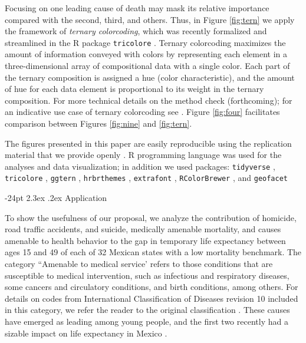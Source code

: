\documentclass[10pt, twoside, parskip=half]{article}
\makeatletter
\renewcommand\section{\@startsection {section}{1}{\z@}%
                                   {-24pt}%
                                   {2.3ex \@plus.2ex}%
                                   {\normalfont\large\bfseries}}
\makeatother
\begin{document}
Focusing on one leading cause of death may mask its relative importance compared with the second, third, and others. Thus, in Figure \ref{fig:tern} we apply the framework of \emph{ternary colorcoding}, which was recently formalized and streamlined in the R package \texttt{tricolore} \citep{scholey2018}. Ternary colorcoding maximizes the amount of information conveyed with colors by representing each element in a three-dimensional array of compositional data with a single color. Each part of the ternary composition is assigned a hue (color characteristic), and the amount of hue for each data element is proportional to its weight in the ternary composition. For more technical details on the method check \citet{scholeyforthcomingdr} (forthcoming); for an indicative use case of ternary colorcoding see \citet{kashnitsky2018tl}. Figure \ref{fig:four} facilitates comparison between Figures \ref{fig:nine} and \ref{fig:tern}.

The figures presented in this paper are easily reproducible using the replication material that we provide openly \citep{kashnitsky2019}. R programming language \citep{rcoreteam2018} was used for the analyses and data visualization; in addition we used packages: \texttt{tidyverse} \citep{wickham2017b}, \texttt{tricolore} \citep{scholey2018}, \texttt{ggtern} \citep{hamilton2018jss}, \texttt{hrbrthemes} \citep{rudis2018}, \texttt{extrafont} \citep{chang2014}, \texttt{RColorBrewer} \citep{neuwirth2014}, and \texttt{geofacet} \citep{hafen2019}

\hypertarget{application}{%
\section{Application}\label{application}}

To show the usefulness of our proposal, we analyze the contribution of homicide, road traffic accidents, and suicide, medically amenable mortality, and causes amenable to health behavior to the gap in temporary life expectancy between ages 15 and 49 of each of 32 Mexican states with a low mortality benchmark. The category ``Amenable to medical service' refers to those conditions that are susceptible to medical intervention, such as infectious and respiratory diseases, some cancers and circulatory conditions, and birth conditions, among others. For details on codes from International Classification of Diseases revision 10 included in this category, we refer the reader to the original classification \citep{aburto2018bo}. These causes have emerged as leading among young people, and the first two recently had a sizable impact on life expectancy in Mexico \citep{aburto2016ha, aburto2019ajph}.
\end{document}
